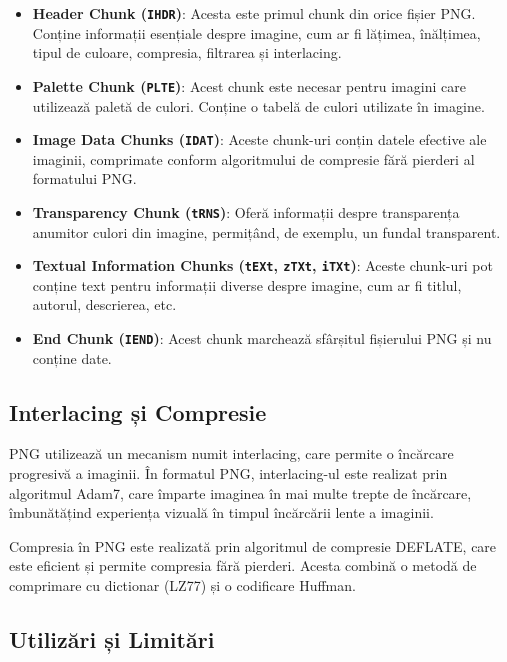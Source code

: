 \documentclass[a4paper,12pt]{report}
\begin{document}
\begin{itemize}
  \item
  \textbf{Header Chunk (\texttt{IHDR})}: Acesta este primul chunk din orice fișier \ac{PNG}.
  Conține informații esențiale despre imagine, cum ar fi lățimea,
  înălțimea, tipul de culoare, compresia, filtrarea și interlacing.

  \item
  \textbf{Palette Chunk (\texttt{PLTE})}: Acest chunk este necesar pentru imagini
  care utilizează paletă de culori.
  Conține o tabelă de culori utilizate în imagine.

  \item
  \textbf{Image Data Chunks (\texttt{IDAT})}: Aceste chunk-uri conțin datele efective ale imaginii,
  comprimate conform algoritmului de compresie fără pierderi al formatului \ac{PNG}.

  \item
  \textbf{Transparency Chunk (\texttt{tRNS})}: Oferă informații despre transparența anumitor culori din imagine, 
  permițând, de exemplu, un fundal transparent.

  \item
  \textbf{Textual Information Chunks (\texttt{tEXt}, \texttt{zTXt}, \texttt{iTXt})}:
  Aceste chunk-uri pot conține text
  pentru informații diverse despre imagine, cum ar fi titlul, autorul, descrierea, etc.

  \item
  \textbf{End Chunk (\texttt{IEND})}:
  Acest chunk marchează sfârșitul fișierului \ac{PNG} și nu conține date.
\end{itemize}

\subsection{Interlacing și Compresie}

PNG utilizează un mecanism numit interlacing, care permite o încărcare progresivă a imaginii.
În formatul \ac{PNG}, interlacing-ul este realizat prin algoritmul Adam7,
care împarte imaginea în mai multe trepte de încărcare,
îmbunătățind experiența vizuală în timpul încărcării lente a imaginii.

Compresia în \ac{PNG} este realizată prin algoritmul de compresie DEFLATE,
care este eficient și permite compresia fără pierderi.
Acesta combină o metodă de comprimare cu dictionar (LZ77) și o codificare Huffman.

\subsection{Utilizări și Limitări}
\end{document}

